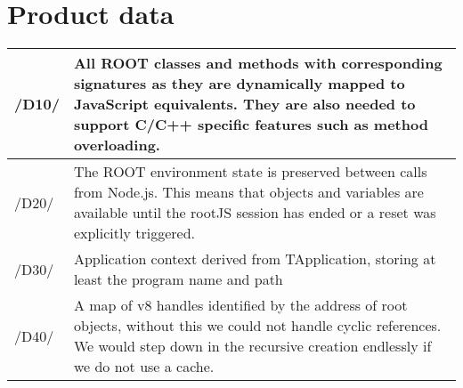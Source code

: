 \chapter{Product data}

\begin{longtable}{|p{1cm} | p{15cm}|}
\hline
/D10/ & All ROOT classes and methods with corresponding signatures as they are dynamically mapped to JavaScript equivalents. They are also needed to support C/C++ specific features such as method overloading.\\
\hline
/D20/ & The ROOT environment state is preserved between calls from Node.js. This means that objects and variables are available until the rootJS session has ended or a reset was explicitly triggered.\\
\hline
/D30/ & Application context derived from TApplication, storing at least the program name and path\\
\hline
/D40/ & A map of v8 handles identified by the address of root objects, without this we could not handle cyclic references. We would step down in the recursive creation endlessly if we do not use a cache.\\
\hline
\end{longtable}